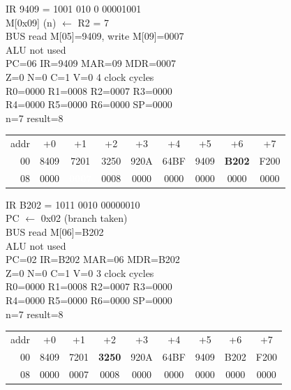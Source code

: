 \noindent\begin{tcolorbox}[stepbox, title={Step 6 \hfill PC 05 \quad ST R2, n}]
\textcolor{dim}{IR} 9409 = 1001 010 0 00001001\\
M[0x09] (n) $\leftarrow$ R2 = 7\\
\textcolor{dim}{BUS} read M[05]=9409, \textcolor{wrt}{write M[09]=0007}\\
\textcolor{dim}{ALU} \textcolor{dim}{not used}\\
PC=06 IR=9409 MAR=09 MDR=0007\\
Z=0 N=0 C=1 V=0 \hfill \textcolor{dim}{4 clock cycles}\\
R0=0000 R1=0008 R2=0007 R3=0000\\
R4=0000 R5=0000 R6=0000 SP=0000\\
\textcolor{dim}{n=7  result=8}\\[1pt]
{\setlength{\tabcolsep}{1.6pt}\begin{tabular}{@{}r*{8}{c}@{}}
\textcolor{dim}{addr} & \textcolor{dim}{+0} & \textcolor{dim}{+1} & \textcolor{dim}{+2} & \textcolor{dim}{+3} & \textcolor{dim}{+4} & \textcolor{dim}{+5} & \textcolor{dim}{+6} & \textcolor{dim}{+7}\\
\textcolor{dim}{00} & 8409 & 7201 & 3250 & 920A & 64BF & 9409 & \cellcolor{pcc}\textbf{B202} & F200\\
\textcolor{dim}{08} & 0000 & \cellcolor{wrt}\textcolor{white}{\textbf{0007}} & \cellcolor{datac}0008 & 0000 & 0000 & 0000 & 0000 & 0000\\
\end{tabular}}
\end{tcolorbox}\hfill\begin{tcolorbox}[stepbox, title={Step 7 \hfill PC 06 \quad BNE loop}]
\textcolor{dim}{IR} B202 = 1011 0010 00000010\\
PC $\leftarrow$ 0x02 (branch taken)\\
\textcolor{dim}{BUS} read M[06]=B202\\
\textcolor{dim}{ALU} \textcolor{dim}{not used}\\
PC=02 IR=B202 MAR=06 MDR=B202\\
Z=0 N=0 C=1 V=0 \hfill \textcolor{dim}{3 clock cycles}\\
R0=0000 R1=0008 R2=0007 R3=0000\\
R4=0000 R5=0000 R6=0000 SP=0000\\
\textcolor{dim}{n=7  result=8}\\[1pt]
{\setlength{\tabcolsep}{1.6pt}\begin{tabular}{@{}r*{8}{c}@{}}
\textcolor{dim}{addr} & \textcolor{dim}{+0} & \textcolor{dim}{+1} & \textcolor{dim}{+2} & \textcolor{dim}{+3} & \textcolor{dim}{+4} & \textcolor{dim}{+5} & \textcolor{dim}{+6} & \textcolor{dim}{+7}\\
\textcolor{dim}{00} & 8409 & 7201 & \cellcolor{pcc}\textbf{3250} & 920A & 64BF & 9409 & B202 & F200\\
\textcolor{dim}{08} & 0000 & \cellcolor{datac}0007 & \cellcolor{datac}0008 & 0000 & 0000 & 0000 & 0000 & 0000\\
\end{tabular}}
\end{tcolorbox}\par\vspace{3pt}
